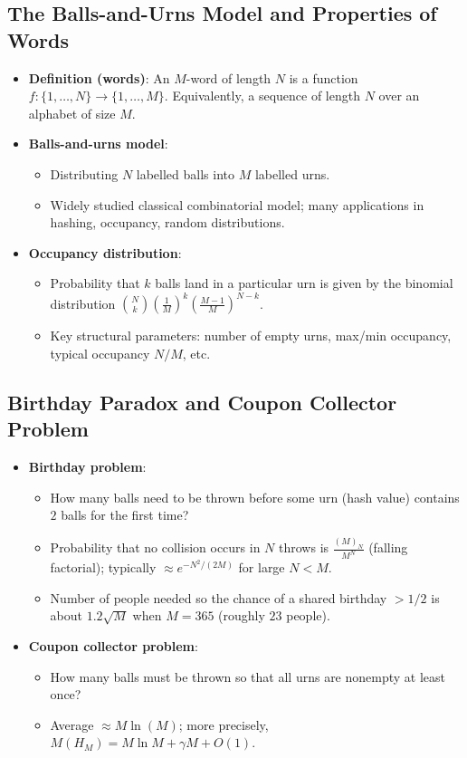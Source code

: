 \documentclass[11pt,letterpaper]{article}
\begin{document}
\subsection{The Balls-and-Urns Model and Properties of Words}
\begin{itemize}
  \item \textbf{Definition (words)}: An $M$-word of length $N$ is a function $f: \{1,\dots,N\}\to\{1,\dots,M\}$. Equivalently, a sequence of length $N$ over an alphabet of size $M$.
  \item \textbf{Balls-and-urns model}:
    \begin{itemize}
      \item Distributing $N$ labelled balls into $M$ labelled urns.
      \item Widely studied classical combinatorial model; many applications in hashing, occupancy, random distributions.
    \end{itemize}
  \item \textbf{Occupancy distribution}:
    \begin{itemize}
      \item Probability that $k$ balls land in a particular urn is given by the binomial distribution $\binom{N}{k} \left(\frac{1}{M}\right)^{k}\!\left(\frac{M-1}{M}\right)^{N-k}$.
      \item Key structural parameters: number of empty urns, max/min occupancy, typical occupancy $N/M$, etc.
    \end{itemize}
\end{itemize}

\subsection{Birthday Paradox and Coupon Collector Problem}
\begin{itemize}
  \item \textbf{Birthday problem}:
    \begin{itemize}
      \item How many balls need to be thrown before some urn (hash value) contains $2$ balls for the first time?
      \item Probability that no collision occurs in $N$ throws is $\frac{(M)_N}{M^N}$ (falling factorial); typically $\approx e^{-N^2/(2M)}$ for large $N<M$.
      \item Number of people needed so the chance of a shared birthday $>1/2$ is about $1.2\sqrt{M}$ when $M=365$ (roughly $23$ people).
    \end{itemize}
  \item \textbf{Coupon collector problem}:
    \begin{itemize}
      \item How many balls must be thrown so that all urns are nonempty at least once?
      \item Average $\approx M\ln(M)$; more precisely, $M(H_M) = M\ln M + \gamma M + O(1)$.
    \end{itemize}
\end{itemize}
\end{document}

